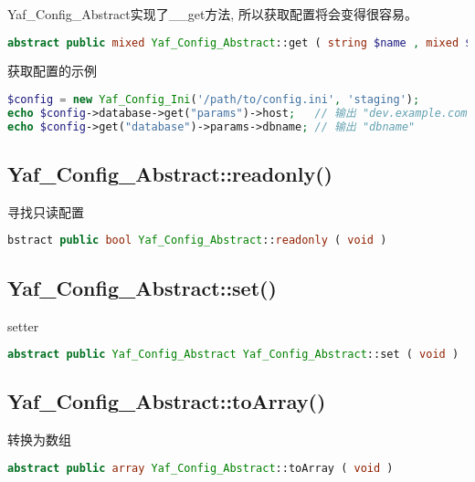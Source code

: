 Yaf\_Config\_Abstract实现了\_\_get方法, 所以获取配置将会变得很容易。







\begin{lstlisting}[language=PHP]
abstract public mixed Yaf_Config_Abstract::get ( string $name , mixed $value )
\end{lstlisting}


\begin{example}
获取配置的示例
\begin{lstlisting}[language=PHP]
$config = new Yaf_Config_Ini('/path/to/config.ini', 'staging');
echo $config->database->get("params")->host;   // 输出 "dev.example.com"
echo $config->get("database")->params->dbname; // 输出 "dbname"
\end{lstlisting}
\end{example}

\subsection{Yaf\_Config\_Abstract::readonly()}


寻找只读配置





\begin{lstlisting}[language=PHP]
bstract public bool Yaf_Config_Abstract::readonly ( void )
\end{lstlisting}

\subsection{Yaf\_Config\_Abstract::set()}

setter


\begin{lstlisting}[language=PHP]
abstract public Yaf_Config_Abstract Yaf_Config_Abstract::set ( void )
\end{lstlisting}

\subsection{Yaf\_Config\_Abstract::toArray()}

转换为数组

\begin{lstlisting}[language=PHP]
abstract public array Yaf_Config_Abstract::toArray ( void )
\end{lstlisting}



